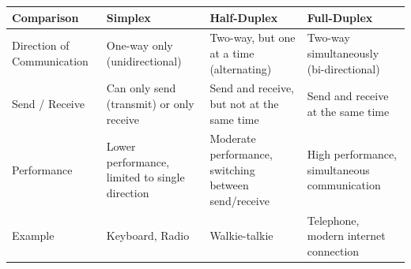 \begin{tabularx}{\textwidth}{|L|L|L|L|}\hline
   \textbf{Comparison} &
   \textbf{Simplex} &
   \textbf{Half-Duplex} &
   \textbf{Full-Duplex} \\\hline
   
   Direction of Communication &
   One-way only (unidirectional) &
   Two-way, but one at a time (alternating) &
   Two-way simultaneously (bi-directional) \\\hline

   Send / Receive	&
   Can only send (transmit) or only receive &
   Send and receive, but not at the same time &
   Send and receive at the same time \\\hline

   Performance &
   Lower performance, limited to single direction &
   Moderate performance, switching between send/receive &
   High performance, simultaneous communication \\\hline

   Example &
   Keyboard, Radio &
   Walkie-talkie &
   Telephone, modern internet connection \\\hline
\end{tabularx}





